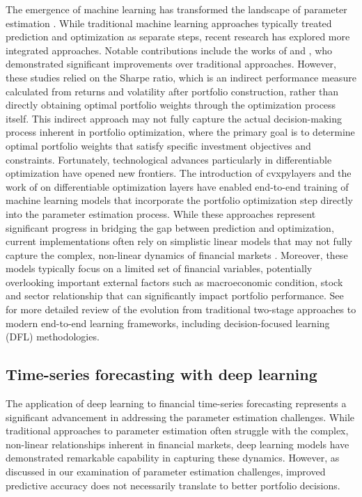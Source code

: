 The emergence of machine learning has transformed the landscape of parameter estimation \citep{kim2021mean, kim2024overview}. While traditional machine learning approaches typically treated prediction and optimization as separate steps, recent research has explored more integrated approaches. Notable contributions include the works of \cite{ban2018machine} and \cite{feng2020taming}, who demonstrated significant improvements over traditional approaches. However, these studies relied on the Sharpe ratio, which is an indirect performance measure calculated from returns and volatility after portfolio construction, rather than directly obtaining optimal portfolio weights through the optimization process itself. This indirect approach may not fully capture the actual decision-making process inherent in portfolio optimization, where the primary goal is to determine optimal portfolio weights that satisfy specific investment objectives and constraints. Fortunately, technological advances particularly in differentiable optimization have opened new frontiers. The introduction of cvxpylayers \citep{cvxpylayers2019} and the work of \cite{amos2017optnet} on differentiable optimization layers have enabled end-to-end training of machine learning models that incorporate the portfolio optimization step directly into the parameter estimation process. While these approaches represent significant progress in bridging the gap between prediction and optimization, current implementations often rely on simplistic linear models that may not fully capture the complex, non-linear dynamics of financial markets \citep{costa2023distributionally, anis2025end}. Moreover, these models typically focus on a limited set of financial variables, potentially overlooking important external factors such as macroeconomic condition, stock and sector relationship that can significantly impact portfolio performance. See \cite{lee2024overview} for more detailed review of the evolution from traditional two-stage approaches to modern end-to-end learning frameworks, including decision-focused learning (DFL) methodologies.

\subsection{Time-series forecasting with deep learning}

The application of deep learning to financial time-series forecasting represents a significant advancement in addressing the parameter estimation challenges. While traditional approaches to parameter estimation often struggle with the complex, non-linear relationships inherent in financial markets, deep learning models have demonstrated remarkable capability in capturing these dynamics. However, as discussed in our examination of parameter estimation challenges, improved predictive accuracy does not necessarily translate to better portfolio decisions.

